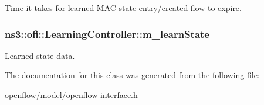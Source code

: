 \hyperlink{classns3_1_1Time}{Time} it takes for learned M\+AC state entry/created flow to expire. 

\subsubsection[{\texorpdfstring{m\+\_\+learn\+State}{m_learnState}}]{ ns3\+::ofi\+::\+Learning\+Controller\+::m\+\_\+learn\+State\hspace{0.3cm}{\ttfamily [protected]}}\hypertarget{classns3_1_1ofi_1_1LearningController_aba8cc65c2c3be6a19f78f8467caeeb56}{}\label{classns3_1_1ofi_1_1LearningController_aba8cc65c2c3be6a19f78f8467caeeb56}


Learned state data. 



The documentation for this class was generated from the following file\+:\begin{DoxyCompactItemize}
\item 
openflow/model/\hyperlink{openflow-interface_8h}{openflow-\/interface.\+h}\end{DoxyCompactItemize}
